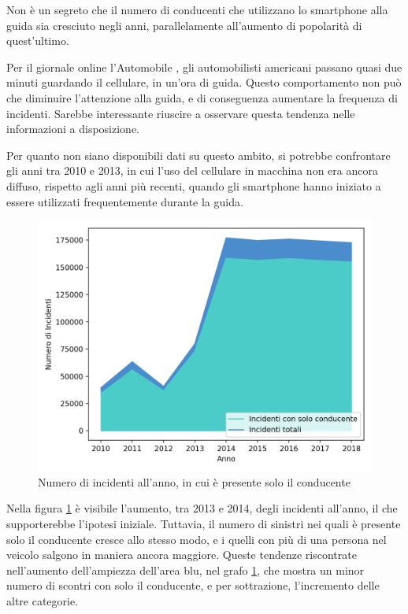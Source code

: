 \documentclass[a4paper,12pt]{report}
\begin{document}
Non è un segreto che il numero di conducenti 
che utilizzano lo smartphone alla guida 
sia cresciuto negli anni, parallelamente all'aumento di popolarità di quest'ultimo. 

Per il giornale online l'Automobile \cite{AUTOMOBILE:1}, gli automobilisti americani 
passano quasi due minuti guardando il cellulare, in un'ora di guida. 
Questo comportamento non può che diminuire l'attenzione alla guida, e di conseguenza 
aumentare la frequenza di incidenti. 
Sarebbe interessante riuscire a osservare questa tendenza nelle 
informazioni a disposizione. 

Per quanto non siano disponibili dati su questo ambito, si potrebbe confrontare gli 
anni tra 2010 e 2013, in cui l'uso del cellulare in macchina non era ancora diffuso, 
rispetto agli anni più recenti, quando gli smartphone hanno iniziato a essere utilizzati 
frequentemente durante la guida. 

\begin{figure}
    \includegraphics[width=\linewidth]{../src/incidenti/incidenti_senza_coords/anno/incremento_incidenti.png}
    \caption{Numero di incidenti all'anno, in cui è presente solo il conducente}
    \label{fig:incremento-incidenti}
\end{figure}

Nella figura \ref{fig:incremento-incidenti} è visibile l'aumento, tra 2013 e 2014, degli 
incidenti all'anno, il che supporterebbe l'ipotesi iniziale. 
Tuttavia, il numero di sinistri nei quali è presente solo il conducente 
cresce allo stesso modo, e i quelli con più di una persona nel veicolo 
salgono in maniera ancora maggiore. 
Queste tendenze riscontrate nell'aumento dell'ampiezza dell'area blu, nel grafo 
\ref{fig:incremento-incidenti}, che mostra un minor numero di scontri con solo il conducente, 
e per sottrazione, l'incremento delle altre categorie. 
\end{document}
